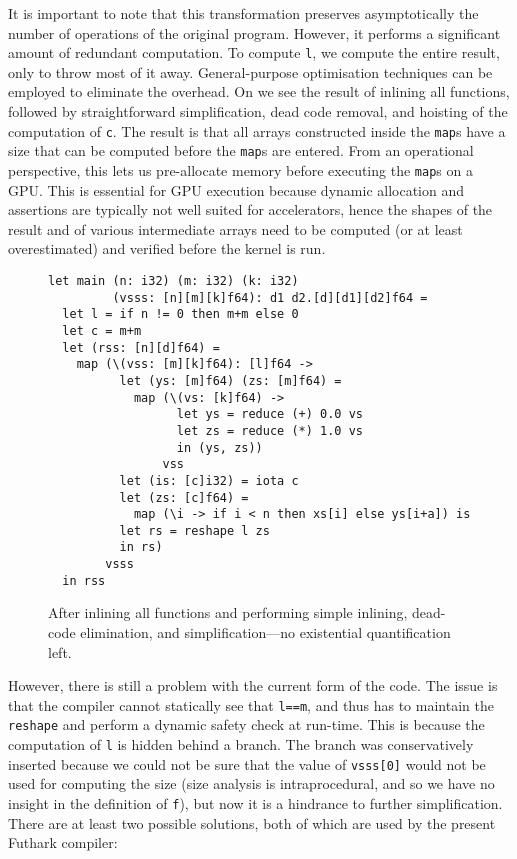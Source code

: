 It is important to note that this transformation preserves
asymptotically the number of operations of the original program.
However, it performs a significant amount of redundant computation.
To compute \lstinline{l}, we compute the entire result, only to throw
most of it away.  General-purpose optimisation techniques can be
employed to eliminate the overhead.  On
 we see the result of inlining all
functions, followed by straightforward simplification, dead code
removal, and hoisting of the computation of \lstinline{c}.  The result
is that all arrays constructed inside the \lstinline{map}s have a size
that can be computed before the \lstinline{map}s are entered.  From an
operational perspective, this lets us pre-allocate memory before
executing the \lstinline{map}s on a GPU.  This is essential for GPU
execution because dynamic allocation and assertions are typically not
well suited for accelerators, hence the shapes of the result and of
various intermediate arrays need to be computed (or at least
overestimated) and verified before the kernel is run.

\begin{figure}
\begin{lstlisting}
let main (n: i32) (m: i32) (k: i32)
         (vsss: [n][m][k]f64): d1 d2.[d][d1][d2]f64 =
  let l = if n != 0 then m+m else 0
  let c = m+m
  let (rss: [n][d]f64) =
    map (\(vss: [m][k]f64): [l]f64 ->
          let (ys: [m]f64) (zs: [m]f64) =
            map (\(vs: [k]f64) ->
                  let ys = reduce (+) 0.0 vs
                  let zs = reduce (*) 1.0 vs
                  in (ys, zs))
                vss
          let (is: [c]i32) = iota c
          let (zs: [c]f64) =
            map (\i -> if i < n then xs[i] else ys[i+a]) is
          let rs = reshape l zs
          in rs)
        vsss
  in rss
\end{lstlisting}

  \caption{After inlining all functions and performing simple
    inlining, dead-code elimination, and simplification---no
    existential quantification left.}
\label{fig:SimplifyFShape}
\end{figure}

However, there is still a problem with the current form of the code.
The issue is that the compiler cannot statically see that
\lstinline{l==m}, and thus has to maintain the \lstinline{reshape} and
perform a dynamic safety check at run-time.  This is because the
computation of \lstinline{l} is hidden behind a branch.  The branch
was conservatively inserted because we could not be sure that the
value of \lstinline{vsss[0]} would not be used for computing the size
(size analysis is intraprocedural, and so we have no insight in the
definition of \lstinline{f}), but now it is a hindrance to further
simplification.  There are at least two possible solutions, both of
which are used by the present Futhark compiler:

